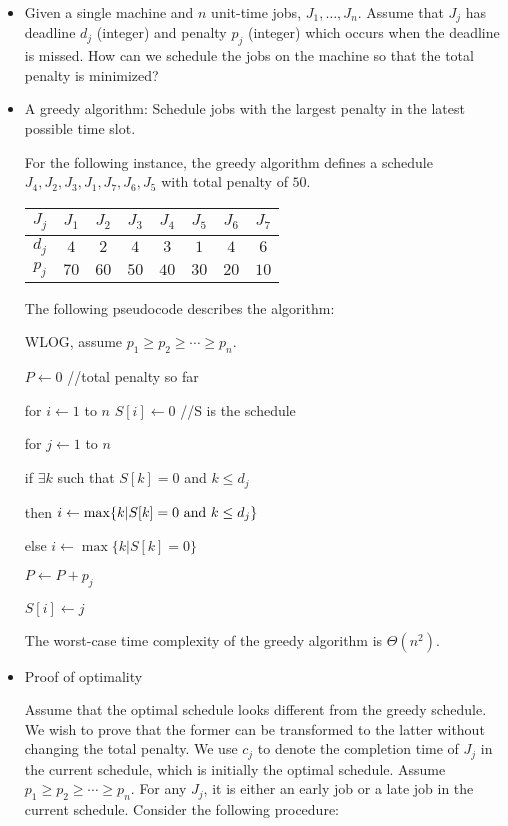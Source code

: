 \documentclass{article}
\begin{document}
\begin{itemize}

\item Given a single machine and $n$ unit-time jobs, $J_1,\ldots,J_n$.
Assume that $J_j$ has deadline $d_j$ (integer) and penalty $p_j$
(integer) which occurs when the deadline is missed.
How can we schedule the jobs on the machine so that the total 
penalty is minimized?

\item A greedy algorithm: Schedule jobs with the largest penalty in the
latest possible time slot.

For the following instance, the greedy algorithm defines a schedule
$J_4,J_2,J_3,J_1,J_7,J_6,J_5$ with total penalty of $50$.

\begin{center}
\begin{tabular}{c|ccccccc}
$J_j$ & $J_1$ & $J_2$ & $J_3$ & $J_4$ & $J_5$ & $J_6$ & $J_7$\\\hline
$d_j$ & $4$ & $2$ & $4$ & $3$ & $1$ & $4$ & $6$\\
$p_j$ & $70$ & $60$ & $50$ & $40$ & $30$ & $20$ & $10$\\
\end{tabular}
\end{center}

The following pseudocode describes the algorithm:

\qquad WLOG, assume $p_1\ge p_2\ge\cdots\ge p_n$.
\par\qquad $P\leftarrow 0$ //total penalty so far
\par\qquad for $i\leftarrow 1$ to $n$ $S[i]\leftarrow 0$ //S is the schedule
\par\qquad for $j\leftarrow 1$ to $n$
\par\qquad\qquad if $\exists k$ such that $S[k]=0$ and $k\le d_j$
\par\qquad\qquad then $i\leftarrow\max\{k|S[k]=0{\rm \ and\ }k\le d_j\}$
\par\qquad\qquad else $i\leftarrow\max\{k|S[k]=0\}$
\par\qquad\qquad\qquad $P\leftarrow P+p_j$
\par\qquad\qquad $S[i]\leftarrow j$

The worst-case time complexity of the greedy algorithm is $\Theta(n^2)$.

\item Proof of optimality

Assume that the optimal schedule looks different
from the greedy schedule. We wish to prove that the former can be
transformed to the latter without changing the total penalty. 
We use $c_j$ to denote the completion time of $J_j$ in the current schedule,
which is initially the optimal schedule.
Assume $p_1\ge p_2\ge\cdots\ge p_n$. For any $J_j$, it is either
an early job or a late job in the current schedule.
Consider the following procedure:


\end{itemize}
\end{document}
